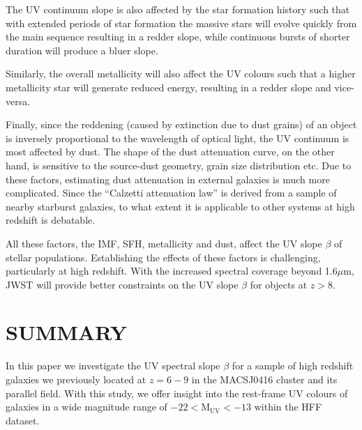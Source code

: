 \documentclass[twocolumn]{aastex63}
\begin{document}
The UV continuum slope is also affected by the star formation history such that with extended periods of star formation the massive stars will evolve quickly from the main sequence resulting in a redder slope, while continuous bursts of shorter duration will produce a bluer slope. 

Similarly, the overall metallicity will also affect the UV colours such that a higher metallicity star will generate reduced energy, resulting in a redder slope and vice-versa.

Finally, since the reddening (caused by extinction due to dust grains) of an object is inversely proportional to the wavelength of optical light, the UV continuum is most affected by dust. The shape of the dust attenuation curve, on the other hand, is sensitive to the source-dust geometry, grain size distribution etc. Due to these factors, estimating dust attenuation in external galaxies is much more complicated. Since the ``Calzetti attenuation law'' \citep{Calzetti1994} is derived from a sample of nearby starburst galaxies, to what extent it is applicable to other systems at high redshift is debatable.

All these factors, the IMF, SFH, metallicity and dust, affect the UV slope $\beta$ of stellar populations. Establishing the effects of these factors is challenging, particularly at high redshift. With the increased spectral coverage beyond 1.6$\mu$m, JWST will provide better constraints on the UV slope $\beta$ for objects at $z>8$.

\section{SUMMARY}\label{sec:summary}
In this paper we investigate the UV spectral slope $\beta$ for a sample of high redshift galaxies we previously located at $z=6-9$ in the MACSJ0416 cluster and its parallel field. With this study, we offer insight into the rest-frame UV colours of galaxies in a wide magnitude range of $-22<\mathrm{M_{UV}<-13}$ within the HFF dataset.
\end{document}
